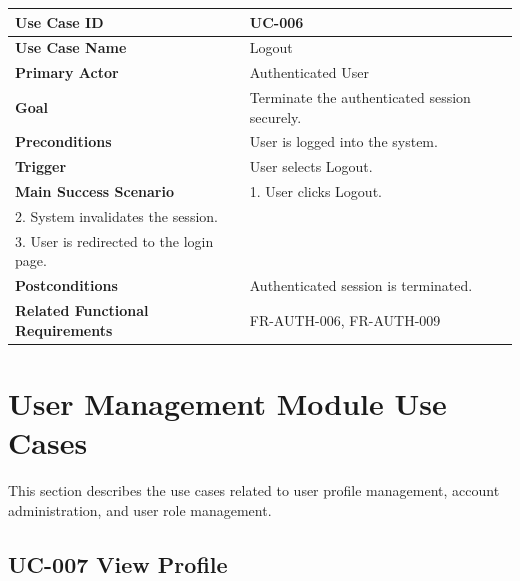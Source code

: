 \begin{longtable}{|p{4cm}|p{10cm}|}

\hline
\textbf{Use Case ID} &
UC-006 \\
\hline

\textbf{Use Case Name} &
Logout \\
\hline

\textbf{Primary Actor} &
Authenticated User \\
\hline

\textbf{Goal} &
Terminate the authenticated session securely. \\
\hline

\textbf{Preconditions} &
User is logged into the system. \\
\hline

\textbf{Trigger} &
User selects Logout. \\
\hline

\textbf{Main Success Scenario} &
1. User clicks Logout.\\
2. System invalidates the session.\\
3. User is redirected to the login page.\\
\hline

\textbf{Postconditions} &
Authenticated session is terminated. \\
\hline

\textbf{Related Functional Requirements} &
FR-AUTH-006, FR-AUTH-009 \\
\hline

\end{longtable}

\section{User Management Module Use Cases}
\label{sec:user-management-usecases}

This section describes the use cases related to user profile
management, account administration, and user role management.

\subsection{UC-007 View Profile}

